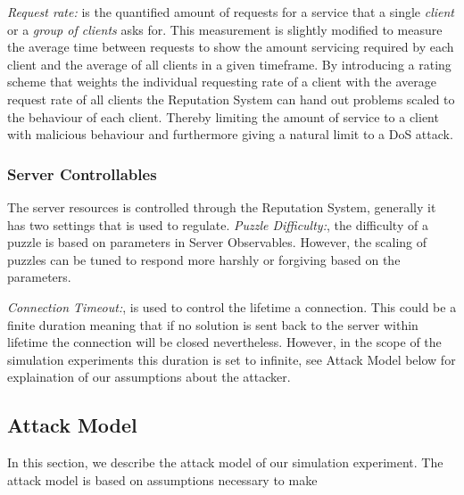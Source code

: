 \emph{Request rate:} is the quantified amount of requests for a service that a single \emph{client} or a \emph{group of clients} asks for. This measurement is slightly modified to measure the average time between requests to show the amount servicing required by each client and the average of all clients in a given timeframe. By introducing a rating scheme that weights the individual requesting rate of a client with the average request rate of all clients the Reputation System can hand out problems scaled to the behaviour of each client. Thereby limiting the amount of service to a client with malicious behaviour and furthermore giving a natural limit to a DoS attack.


\subsubsection{Server Controllables}
The server resources is controlled through the Reputation System, generally it has two settings that is used to regulate.
\emph{Puzzle Difficulty:}, the difficulty of a puzzle is based on parameters in Server Observables. However, the scaling of puzzles can be tuned to respond more harshly or forgiving based on the parameters.

\emph{Connection Timeout:}, is used to control the lifetime a connection. This could be a finite duration meaning that if no solution is sent back to the server within lifetime the connection will be closed nevertheless.
However, in the scope of the simulation experiments this duration is set to infinite, see Attack Model below for explaination of our assumptions about the attacker. 
\subsection{Attack Model}
In this section, we describe the attack model of our simulation experiment. The attack model is based on assumptions necessary to make

